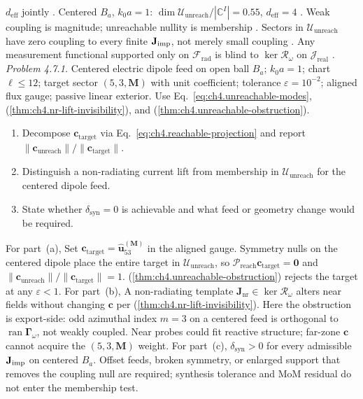 \(d_{\mathrm{eff}}\) jointly \cite{harrington2001}.
Centered \(B_{a}\), \(k_{0}a=1\): \(\dim\mathcal{U}_{\mathrm{unreach}}/|\mathbb{C}^{I}|=0.55\), \(d_{\mathrm{eff}}=4\) \cite{hansen1988}.
Weak coupling is magnitude; unreachable nullity is membership \cite{hansen1988}. Sectors in \(\mathcal{U}_{\mathrm{unreach}}\)
have zero coupling to every finite \(\mathbf{J}_{\mathrm{imp}}\), not merely small coupling \cite{devaney2004}. 
\label{cor:ch4.farzone-nr-blind}
Any measurement functional supported only on \(\mathcal{F}_{\mathrm{rad}}\) is blind to \(\ker\mathcal{R}_\omega\) on \(\mathcal{J}_{\mathrm{real}}\)
\cite{stratton1941}.
\emph{Problem 4.7.1.} Centered electric dipole feed on open ball $B_{a}$; $k_{0}a=1$; chart $\ell\le12$; target sector $(5,3,\mathbf{M})$ with unit coefficient; tolerance $\varepsilon=10^{-2}$; aligned flux gauge; passive linear exterior. Use Eq.~\eqref{eq:ch4.unreachable-modes}, (\ref{thm:ch4.nr-lift-invisibility}), and (\ref{thm:ch4.unreachable-obstruction}).
\begin{enumerate}
\item[(a)] Decompose $\mathbf{c}_{\mathrm{target}}$ via Eq.~\eqref{eq:ch4.reachable-projection} and report $\|\mathbf{c}_{\mathrm{unreach}}\|/\|\mathbf{c}_{\mathrm{target}}\|$.
\item[(b)] Distinguish a non-radiating current lift from membership in $\mathcal{U}_{\mathrm{unreach}}$ for the centered dipole feed.
\item[(c)] State whether $\delta_{\mathrm{syn}}=0$ is achievable and what feed or geometry change would be required.
\end{enumerate}
For part~(a), Set $\mathbf{c}_{\mathrm{target}}=\widehat{\mathbf{u}}_{53}^{(\mathbf{M})}$ in the aligned gauge. Symmetry nulls on the centered dipole place the entire target in $\mathcal{U}_{\mathrm{unreach}}$, so $\mathcal{P}_{\mathrm{reach}}\mathbf{c}_{\mathrm{target}}=\mathbf{0}$ and $\|\mathbf{c}_{\mathrm{unreach}}\|/\|\mathbf{c}_{\mathrm{target}}\|=1$. (\ref{thm:ch4.unreachable-obstruction}) rejects the target at any $\varepsilon<1$.
For part~(b), A non-radiating template $\mathbf{J}_{\mathrm{nr}}\in\ker\mathcal{R}_\omega$ alters near fields without changing $\mathbf{c}$ per (\ref{thm:ch4.nr-lift-invisibility}). Here the obstruction is export-side: odd azimuthal index $m=3$ on a centered feed is orthogonal to $\operatorname{ran}\boldsymbol{\Gamma}_\omega$, not weakly coupled. Near probes could fit reactive structure; far-zone $\mathbf{c}$ cannot acquire the $(5,3,\mathbf{M})$ weight.
For part~(c), $\delta_{\mathrm{syn}}>0$ for every admissible $\mathbf{J}_{\mathrm{imp}}$ on centered $B_{a}$. Offset feeds, broken symmetry, or enlarged support that removes the coupling null are required; synthesis tolerance and MoM residual do not enter the membership test.
